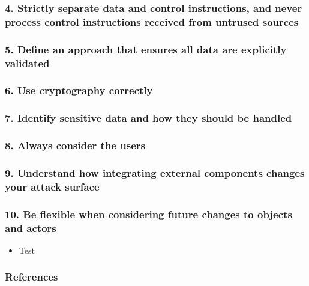 \documentclass[12pt,norsk]{beamer}
\begin{document}
\begin{frame}

	\frametitle{4. Strictly separate data and control instructions, and never process control instructions received from untrused sources}
	

\end{frame}

\begin{frame}

	\frametitle{5. Define an approach that ensures all data are explicitly validated}
	

\end{frame}

\begin{frame}

	\frametitle{6. Use cryptography correctly}
	

\end{frame}

\begin{frame}

	\frametitle{7. Identify sensitive data and how they should be handled}
	

\end{frame}

\begin{frame}

	\frametitle{8. Always consider the users}
	

\end{frame}

\begin{frame}

	\frametitle{9. Understand how integrating external components changes your attack surface}
	

\end{frame}

\begin{frame}

	\frametitle{10. Be flexible when considering future changes to objects and actors}
	\begin{itemize}
		\item Test \cite{sample}
	\end{itemize}
	
	

\end{frame}

\begin{frame}

	\frametitle{References}
		
	
		

\end{frame}




\end{document}
